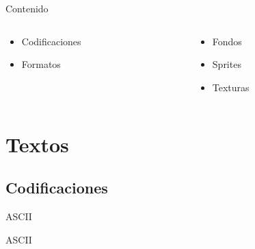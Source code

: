 \begin{frame}{Contenido}
    \begin{columns}
    \begin{column}[T]{0.5\textwidth}
        \begin{itemize}
            \item<2-> Codificaciones
            \item<2-> Formatos
        \end{itemize}
    \end{column}
    \hfill
    \begin{column}[T]{0.5\textwidth}
        \begin{itemize}
            \item<3-> Fondos
            \item<3-> Sprites
            \item<3-> Texturas
        \end{itemize}
    \end{column}
    \end{columns}

    \begin{columns}
    \begin{column}{0.5\textwidth}
        \vfill{}
    \end{column}
    \hfill
    \begin{column}{0.5\textwidth}
    \end{column}
    \end{columns}
\end{frame}

\section{Textos}
\subsection{Codificaciones}
\begin{frame}{ASCII}
\end{frame}

\begin{frame}{ASCII}
\end{frame}

